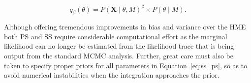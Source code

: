 \begin{equation}  
q_{\beta}\left(\theta\right)=P\left(\mathbf{X}\mid\theta,M\right)^{\beta} \times P\left(\theta\mid M\right).
\label{eq:ss_ps}
\end{equation}  

Although offering tremendous improvements in bias and variance over the HME both PS and SS require considerable computational effort as the marginal likelihood can no longer be estimated from the likelihood trace that is being output from the standard MCMC analysis. 
Further, great care must also be taken to specify proper priors for all parameters in Equation~\ref{eq:ss_ps}, so as to avoid numerical instabilities when the integration approaches the prior.  











